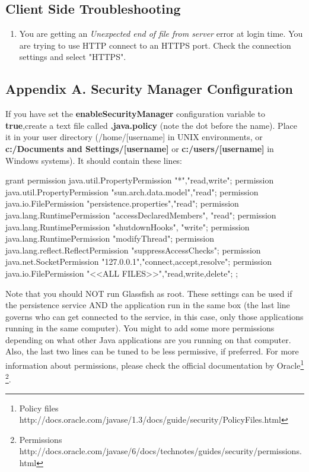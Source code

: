 \documentclass[a4paper]{article}
\begin{document}
				\subsection{Client Side Troubleshooting}
				\begin{enumerate}
					\item You are getting an \textit{Unexpected end of file from server} error at login time. You are trying to use HTTP connect to an HTTPS port. Check the connection settings and select "HTTPS".
				\end{enumerate}
		\newpage
		\begin{appendices}
			\appendix
			\section{Appendix A. Security Manager Configuration} \label{app:AppendixA}
			If you have set the \textbf{enableSecurityManager} configuration variable to \textbf{true},create a text file called \textbf{.java.policy} (note the dot before the name). Place it in your user directory (/home/[username] in UNIX environments, or \textbf{c:/Documents and Settings/[username]} or \textbf{c:/users/[username]} in Windows systems). It should contain these lines:
			
			\begin{verbbox}
				grant {
					permission java.util.PropertyPermission "*","read,write";
					permission java.util.PropertyPermission "sun.arch.data.model","read";
					permission java.io.FilePermission "persistence.properties","read";
					permission java.lang.RuntimePermission "accessDeclaredMembers", "read";
					permission java.lang.RuntimePermission "shutdownHooks", "write";
					permission java.lang.RuntimePermission "modifyThread";
					permission java.lang.reflect.ReflectPermission "suppressAccessChecks";
					permission java.net.SocketPermission "127.0.0.1","connect,accept,resolve";
					permission java.io.FilePermission "<<ALL FILES>>","read,write,delete";
				};
			\end{verbbox}
			\begin{figure}[ht]
				\centering	
				\theverbbox
			\end{figure}
			Note that you should NOT run Glassfish as root. These settings can be used if the persistence service AND the application run in the same box (the last line governs who can get connected to the service, in this case, only those applications running in the same computer). You might to add some more permissions depending on what other Java applications are you running on that computer. Also, the last two lines can be tuned to be less permissive, if preferred. For more information about permissions, please check the official documentation by Oracle\footnote{Policy files http://docs.oracle.com/javase/1.3/docs/guide/security/PolicyFiles.html} \footnote{Permissions http://docs.oracle.com/javase/6/docs/technotes/guides/security/permissions.html}.
			

\end{appendices}
\end{document}
